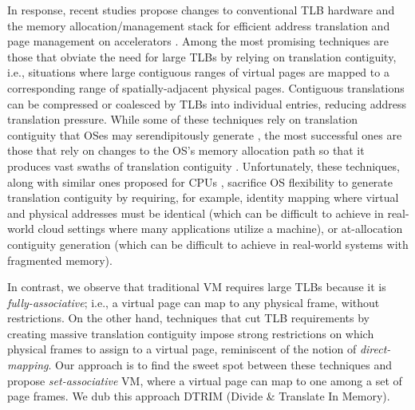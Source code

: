 In response, recent studies propose changes to conventional TLB
hardware and the memory allocation/management stack for efficient
address translation and page management on accelerators
\cite{pichai:architectural, power:supporting,
  ausavarungnirun:mosaic}. Among the most promising techniques are
those that obviate the need for large TLBs by relying on translation
contiguity, i.e., situations where large contiguous ranges of virtual
pages are mapped to a corresponding range of spatially-adjacent
physical pages. Contiguous translations can be compressed or coalesced
by TLBs into individual entries, reducing address translation
pressure. While some of these techniques rely on translation
contiguity that OSes may serendipitously generate \cite{pham:colt,
  bhattacharjee:large-reach, cox:efficient, pham:increasing}, the most
successful ones are those that rely on changes to the OS's memory
allocation path so that it produces vast swaths of translation
contiguity \cite{haria:devirtualizing}. Unfortunately, these
techniques, along with similar ones proposed for CPUs
\cite{basu:efficient, gandhi:range}, sacrifice OS flexibility to
generate translation contiguity by requiring, for example, identity
mapping where virtual and physical addresses must be identical (which
can be difficult to achieve in real-world cloud settings where many
applications utilize a machine), or at-allocation contiguity
generation (which can be difficult to achieve in real-world systems
with fragmented memory). %

In contrast, we observe that traditional VM requires large
TLBs because it is {\it fully-associative}; i.e., a virtual page can
map to any physical frame, without restrictions. On the other hand, techniques that cut TLB
requirements by creating massive translation contiguity
\cite{basu:efficient, gandhi:range, haria:devirtualizing} impose
strong restrictions on which physical frames to assign to a virtual
page, reminiscent of the notion of {\it direct-mapping}. Our approach
is to find the sweet spot between these techniques and propose {\it
  set-associative} VM, where a virtual page can map to one among a set
of page frames. We dub this approach DTRIM (Divide \& Translate In Memory). 

